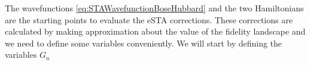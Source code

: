 The wavefunctions \cref{eq:STAWavefunctionBoseHubbard} and the two Hamiltonians are the starting points to evaluate the eSTA corrections.
These corrections are calculated by making approximation about the value of the fidelity landscape and we need to define some variables conveniently.
We will start by defining the variables $G_n$

